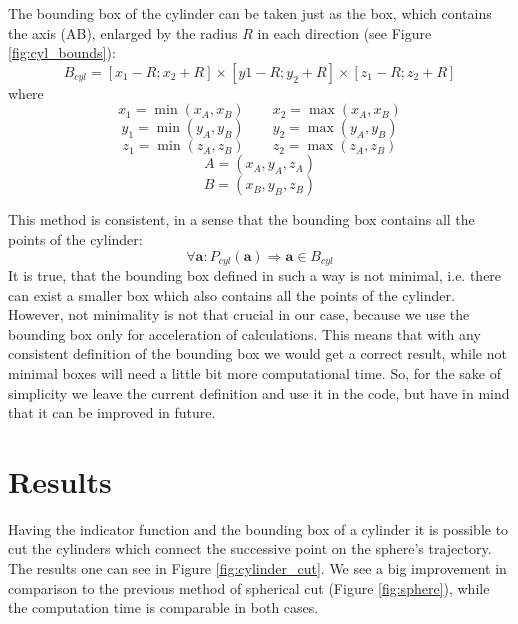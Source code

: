 \documentclass[12pt]{article}
\begin{document}
The bounding box of the cylinder can be taken just as the box, which contains the axis (AB), enlarged by the radius $R$ in each direction 
(see Figure \ref{fig:cyl_bounds}):
\[
   B_{cyl} = [x_1-R;x_2+R] \times [y1-R; y_2+R] \times [z_1-R; z_2+R]
\]
where 
$$ x_1 = \min(x_A,x_B)  \qquad  x_2 = \max(x_A,x_B)  $$
\[ y_1 = \min(y_A,y_B)  \qquad  y_2 = \max(y_A,y_B)  \]
\[ z_1 = \min(z_A,z_B)  \qquad  z_2 = \max(z_A,z_B)  \]
\[  A = (x_A,y_A,z_A)  \]
\[  B = (x_B,y_B,z_B)  \]

This method is consistent, in a sense that the bounding box contains all the points of the cylinder:
\[
   \forall \mathbf a : P_{cyl}(\mathbf a) \Rightarrow \mathbf a \in B_{cyl}
\]
It is true, that the bounding box defined in such a way is not minimal, i.e. there can exist a smaller box which also contains all the points of the cylinder. 
However, not minimality is not that crucial in our case, because we use the bounding box only for acceleration of calculations.
This means that with any consistent definition of the bounding box we would get a correct result, while not minimal boxes will need a little bit more computational time.
So, for the sake of simplicity we leave the current definition and use it in the code, but have in mind that it can be improved in future.

\section{Results}

Having the indicator function and the bounding box of a cylinder it is possible to cut the cylinders which connect the successive point on the sphere's trajectory. 
The results one can see in Figure \ref{fig:cylinder_cut}.
We see a big improvement in comparison to the previous method of spherical cut (Figure \ref{fig:sphere}), while the computation time is comparable in both cases. 
\end{document}
